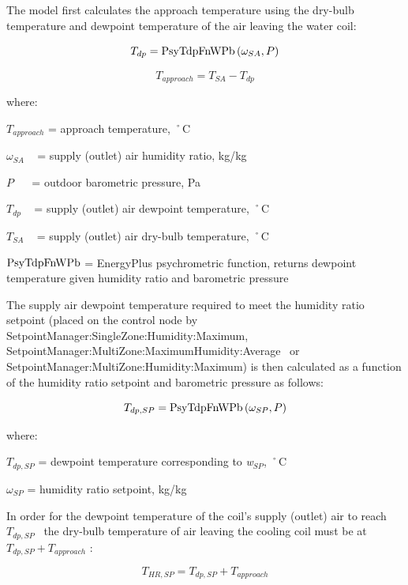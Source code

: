 The model first calculates the approach temperature using the dry-bulb temperature and dewpoint temperature of the air leaving the water coil:

\begin{equation}
{T_{dp}} = {\rm{PsyTdpFnWPb}}\left( {{\omega_{SA}},P} \right)
\end{equation}

\begin{equation}
{T_{approach}} = {T_{SA}} - {T_{dp}}
\end{equation}

where:

\({T_{approach}}\) = approach temperature, ˚C

\({\omega_{SA}}\) ~ = supply (outlet) air humidity ratio, kg/kg

\(P\) ~~ = outdoor barometric pressure, Pa

\({T_{dp}}\) ~ = supply (outlet) air dewpoint temperature, ˚C

\({T_{SA}}\) ~ = supply (outlet) air dry-bulb temperature, ˚C

\({\rm{PsyTdpFnWPb}}\) = EnergyPlus psychrometric function, returns dewpoint temperature given humidity ratio and barometric pressure

The supply air dewpoint temperature required to meet the humidity ratio setpoint (placed on the control node by SetpointManager:SingleZone:Humidity:Maximum, SetpointManager:MultiZone:MaximumHumidity:Average~ or SetpointManager:MultiZone:Humidity:Maximum) is then calculated as a function of the humidity ratio setpoint and barometric pressure as follows:

\begin{equation}
{T_{dp,SP}} = {\rm{PsyTdpFnWPb}}\left( {{\omega_{SP}},P} \right)
\end{equation}

where:

\({T_{dp,SP}}\) = dewpoint temperature corresponding to \emph{w\(_{SP}\)}, ˚C

\({\omega_{SP}}\) = humidity ratio setpoint, kg/kg

In order for the dewpoint temperature of the coil's supply (outlet) air to reach \({T_{dp,SP}}\) ~the dry-bulb temperature of air leaving the cooling coil must be at \({T_{dp,SP}} + {T_{approach}}\) :

\begin{equation}
{T_{HR,SP}} = {T_{dp,SP}} + {T_{approach}}
\end{equation}

